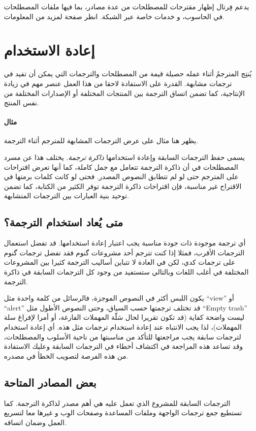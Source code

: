 يدعم فِرتال إظهار مقترحات للمصطلحات من عدة مصادر، بما فيها ملفات
المصطلحات في الحاسوب، و خدمات خاصة عبر الشبكة. انظر صفحة
\at[ref:36503815] لمزيد من المعلومات.

\chapter{إعادة الاستخدام}
يُنتِج المترجمُ أثناء عمله حصيلة قيمة من المصطلحات والترجمات التي يمكن
أن تفيد في ترجمات مشابهة. القدرة على الاستفادة لاحقا من هذا العمل عنصر
مهم في زيادة الإنتاجية، كما تضمن اتساق الترجمة بين المنتجات المختلفة أو
الإصدارات المختلفة من نفس المنتج.

\subsubsection{مثال}
يظهر هنا مثال على عرض الترجمات المشابهة للمترجم أثناء الترجمة.



يسمى حفظ الترجمات السابقة وإعادة استخدامها {\it ذاكرة ترجمة}. يختلف هذا
عن مسرد المصطلحات في أن ذاكرة الترجمة تتعامل مع جمل كاملة، كما أنها
تعرض اقتراحات على المترجم حتى لو لم تتطابق النصوص المصدر. فحتى لو كانت
كلمات برمتها في الاقتراح غير مناسبة، فإن اقتراحات ذاكرة الترجمة توفر
الكثير من الكتابة، كما تضمن توحيد بنية العبارات بين الترجمات المتشابهة.

\section{متى يُعاد استخدام الترجمة؟}
أي ترجمة موجودة ذات جودة مناسبة يجب اعتبار إعادة استخدامها. قد تفضل
استعمال الترجمات الأقرب، فمثلا إذا كنت تترجم أحد مشروعات گنوم فقد تفضل
ترجمات گنوم على ترجمات كدي، لكن في العادة لا تتباين أساليب الترجمة
كثيرا بين المشروعات المختلفة في أغلب اللغات وبالتالي ستستفيد من وجود كل
الترجمات السابقة في ذاكرة الترجمة.

يكون اللبس أكثر في النصوص الموجزة، فالرسائل من كلمة واحدة مثل “view” أو
“alert” قد تختلف ترجمتها حسب السياق، وحتى النصوص الأطول مثل “Empty
trash” ليست واضحة كفاية (قد تكون تقريرا لحال سَلّة المهملات الفارغة، أو
أمرا لإفراغ سلة المهملات)، لذا يجب الانتباه عند إعادة استخدام ترجمات
مثل هذه. أي إعادة استخدام لترجمات سابقة يجب مراجعتها للتأكد من مناسبتها
من ناحية الأسلوب والمصطلحات، وقد تساعد هذه المراجعة في اكتشاف أخطاء في
الترجمات السابقة وعليك الاستفادة من هذه الفرصة لتصويب الخطأ في مصدره.

\section{بعض المصادر المتاحة}
الترجمات السابقة للمشروع الذي تعمل عليه هي أهم مصدر لذاكرة الترجمة. كما
تستطيع جمع ترجمات الواجهة وملفات المساعدة وصفحات الوِب و غيرها معا
لتسريع العمل وضمان اتساقه.

